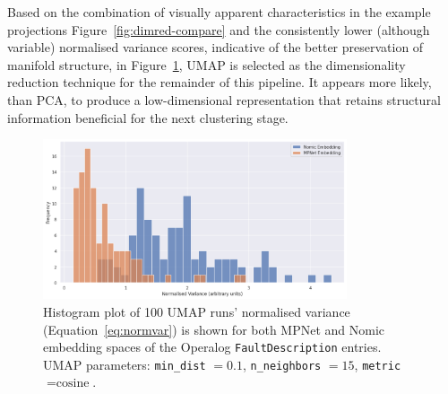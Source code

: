 \documentclass[10pt,oneside]{report}
\begin{document}
Based on the combination of visually apparent characteristics in the example projections Figure~\ref{fig:dimred-compare} and the consistently lower (although variable) normalised variance scores, indicative of the better preservation of manifold structure, in Figure~\ref{fig:normvarumap}, UMAP is selected as the dimensionality reduction technique for the remainder of this pipeline. It appears more likely, than PCA, to produce a low-dimensional representation that retains structural information beneficial for the next clustering stage. 



\begin{figure}[htbp]
\centering
\includegraphics[width=0.8\textwidth]{distUMAP.png}
\caption{Histogram plot of 100 UMAP runs' normalised variance (Equation~\ref{eq:normvar}) is shown for both MPNet and Nomic embedding spaces of the Operalog \texttt{FaultDescription} entries. UMAP parameters: \texttt{min\_dist} $=0.1$, \texttt{n\_neighbors} $=15$, \texttt{metric} $= \text{cosine}$.}
\label{fig:normvarumap}
\end{figure}
\end{document}

